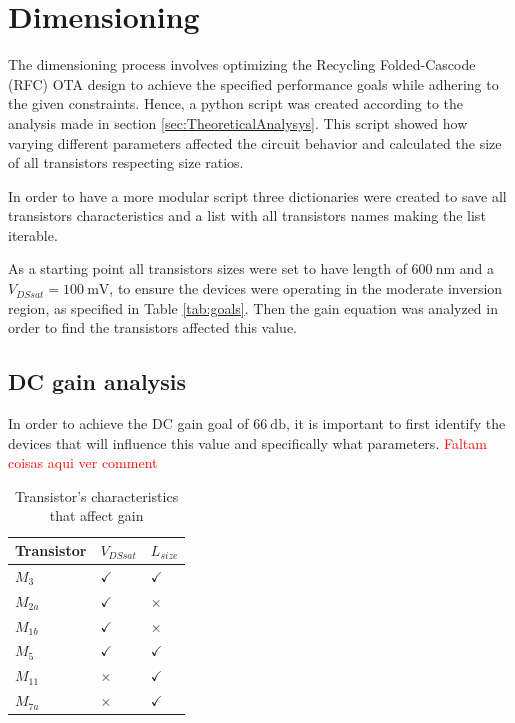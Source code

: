 \section{Dimensioning}

The dimensioning process involves optimizing the Recycling Folded-Cascode (RFC) OTA design to achieve the specified performance goals while adhering to the given constraints. Hence, a python script was created according to the analysis made in section \ref{sec:TheoreticalAnalysys}. This script showed how varying different parameters affected the circuit behavior and calculated the size of all transistors respecting size ratios. 

In order to have a more modular script three dictionaries were created to save all transistors characteristics and a list with all transistors names making the list iterable.

As a starting point all transistors sizes were set to have length of $\SI{600}{\nano\meter}$ and a $V_{DSsat} = \SI{100}{\milli\volt}$, to ensure the devices were operating in the moderate inversion region, as specified in Table \ref{tab:goals}. Then the gain equation was analyzed in order to find the transistors affected this value.

\subsection{DC gain analysis}
\label{sec:DCGain}
In order to achieve the DC gain goal of $\SI{66}{\decibel}$, it is important to first identify the devices that will influence this value and specifically what parameters. \textcolor{red}{Faltam coisas aqui ver comment}


\begin{table}[H]
    \centering
    \caption{Transistor's characteristics that affect gain}
    \begin{tabularx}{\textwidth}{>{\centering\arraybackslash}X >{\centering\arraybackslash}X >{\centering\arraybackslash}X}
        \toprule
        \textbf{Transistor} & \textbf{$V_{DSsat}$} & \textbf{$L_{size}$} \\
        \midrule
        $M_{3}$ & $\checkmark$ & $\checkmark$\\
        \midrule
        $M_{2a}$ & $\checkmark$ & $\times$\\
        \midrule
        $M_{1b}$ & $\checkmark$ & $\times$\\
        \midrule
        $M_{5}$ & $\checkmark$ & $\checkmark$\\
        \midrule
        $M_{11}$ & $\times$ & $\checkmark$\\
        \midrule
        $M_{7a}$ & $\times$ & $\checkmark$\\
        \bottomrule
    \end{tabularx}
    \label{tab:GainTransistors}
\end{table}

